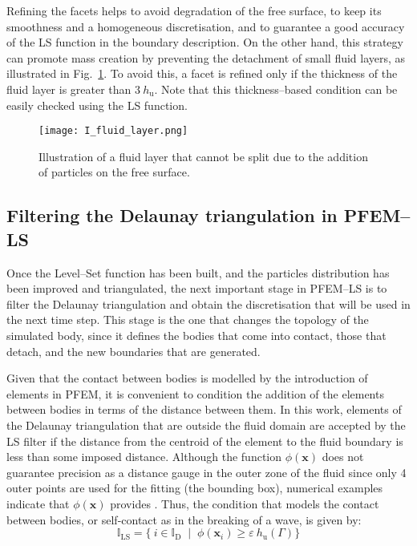 \documentclass[final,3p,times]{elsarticle}
\newcommand{\EF}[1]{{\color{black}{#1}}}
\begin{document}
Refining the facets helps to avoid degradation of the free surface, to keep its smoothness and a homogeneous discretisation, and to guarantee a good accuracy of the LS function in the boundary description. On the other hand, this strategy can promote mass creation by preventing the detachment of small fluid layers, as illustrated in Fig.~\ref{Fig:thinLayer}. To avoid this, a facet is refined only if the thickness of the fluid layer is greater than $3\: h_\mathrm{u}$. Note that this thickness--based condition can be easily checked using the LS function.

\begin{figure}[t!]
\captionsetup[subfigure]{labelformat=empty}
\centering 
	\texttt{[image: I\_fluid\_layer.png]}
	\caption{Illustration of a fluid layer that cannot be split due to the addition of particles on the free surface.}
\label{Fig:thinLayer}
\end{figure}


\subsection{Filtering the Delaunay triangulation in PFEM--LS}

Once the Level--Set function has been built, and the particles distribution has been improved and triangulated, the next important stage in PFEM--LS is to filter the Delaunay triangulation and obtain the discretisation that will be used in the next time step. This stage is the one that changes the topology of the simulated body, since it defines the bodies that come into contact, those that detach, and the new boundaries that are generated. 

Given that the contact between bodies is modelled by the introduction of elements in PFEM, it is convenient to condition the addition of the elements between bodies in terms of the distance between them. In this work, elements of the Delaunay triangulation that are outside the fluid domain are accepted by the LS filter if the distance from the centroid of the element to the fluid boundary is less than some imposed distance. Although the function $\phi(\mathbf{x})$ does not guarantee precision as a distance gauge in the outer zone of the fluid since only 4 outer points are used for the fitting (the bounding box), numerical examples indicate that $\phi(\mathbf{x})$ provides \EF{reliable topological information and a consistent distance to the boundaries}. Thus, the condition that models the contact between bodies, or self-contact as in the breaking of a wave, is given by:
%
\begin{equation} \label{EQ:IcLS}
\mathbb{I}_\mathrm{LS} = \{\:i \in \mathbb{I}_\mathrm{D} \; \mid \; \phi(\mathbf{x}_i) \geq \varepsilon \: h_\mathrm{u}(\Gamma) \}
\end{equation}
\end{document}
